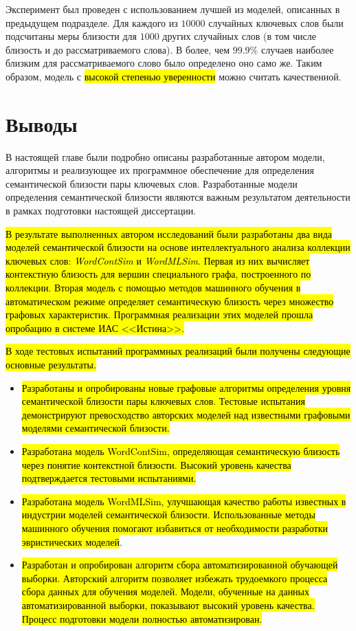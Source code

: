 Эксперимент был проведен с использованием лучшей из моделей, описанных в предыдущем подразделе. Для каждого из $10000$ случайных ключевых слов были подсчитаны меры близости для $1000$ других случайных слов (в том числе близость и до рассматриваемого слова). В более, чем $99.9\%$ случаев наиболее близким для рассматриваемого слово было определено оно само же. Таким образом, модель с \hl{высокой степенью уверенности} можно считать качественной.

\section{Выводы}

В настоящей главе были подробно описаны разработанные автором модели, алгоритмы и реализующее их программное обеспечение для определения семантической близости пары ключевых слов. Разработанные модели определения семантической близости являются важным результатом деятельности в рамках подготовки настоящей диссертации.

\hl{В результате выполненных автором исследований были разработаны два вида моделей семантической близости на основе интеллектуального анализа коллекции ключевых слов: \emph{WordContSim} и \emph{WordMLSim}. Первая из них вычисляет контекстную близость для вершин специального графа, построенного по коллекции. Вторая модель с помощью методов машинного обучения в автоматическом режиме определяет семантическую близость через множество графовых характеристик. Программная реализации этих моделей прошла опробацию в системе ИАС <<Истина>>.}

\hl{В ходе тестовых испытаний программных реализаций были получены следующие основные результаты.}
\begin{itemize}
    \item \hl{Разработаны и опробированы новые графовые алгоритмы определения уровня семантической близости пары ключевых слов. Тестовые испытания демонстрируют превосходство авторских моделей над известными графовыми моделями семантической близости.}
    \item \hl{Разработана модель WordContSim, определяющая семантическую близость через понятие контекстной близости. Высокий уровень качества подтверждается тестовыми испытаниями.}
    \item \hl{Разработана модель WordMLSim, улучшающая качество работы известных в индустрии моделей семантической близости. Использованные методы машинного обучения помогают избавиться от необходимости разработки эвристических моделей}.
    \item \hl{Разработан и опробирован алгоритм сбора автоматизированной обучающей выборки. Авторский алгоритм позволяет избежать трудоемкого процесса сбора данных для обучения моделей. Модели, обученные на данных автоматизированной выборки, показывают высокий уровень качества. Процесс подготовки модели полностью автоматизирован.}
\end{itemize}

